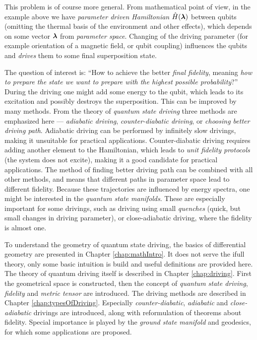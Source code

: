 This problem is of course more general. From mathematical point of view, in the example above we have \emph{parameter driven Hamiltonian} $\hat{H}({\bm\lambda})$ between qubits (omitting the thermal basis of the environment and other effects), which depends on some vector ${\bm\lambda}$ from \emph{parameter space}. Changing of the driving parameter (for example orientation of a magnetic field, or qubit coupling) influences the qubits and \emph{drives} them to some final superposition state.

The question of interest is: “How to achieve the better \emph{final fidelity}, meaning \emph{how to prepare the state we want to prepare with the highest possible probability}?” During the driving one might add some energy to the qubit, which leads to its excitation and possibly destroys the superposition. This can be improved by many methods. From the theory of \emph{quantum state driving} three methods are emphasized here — \emph{adiabatic driving}, \emph{counter-diabatic driving}, or \emph{choosing better driving path}. Adiabatic driving can be performed by infinitely slow drivings, making it unsuitable for practical applications. Counter-diabatic driving requires adding another element to the Hamiltonian, which leads to \emph{unit fidelity protocols} (the system does not excite), making it a good candidate for practical applications. The method of finding better driving path can be combined with all other methods, and means that different paths in parameter space lead to different fidelity. Because these trajectories are influenced by energy spectra, one might be interested in the \emph{quantum state manifolds}. These are especially important for some drivings, such as driving using small \emph{quenches} (quick, but small changes in driving parameter), or close-adiabatic driving, where the fidelity is almost one.

To understand the geometry of quantum state driving, the basics of differential geometry are presented in Chapter \ref{chap:mathIntro}. It does not serve the ifull theory, only some basic intuition is build and useful definitions are provided here. The theory of quantum driving itself is described in Chapter \ref{chap:driving}. First the geometrical space is constructed, then the concept of \emph{quantum state driving}, \emph{fidelity} and \emph{metric tensor} are introduced.
The driving methods are described in Chapter \ref{chap:typesOfDriving}. Especially \emph{counter-diabatic}, \emph{adiabatic} and \emph{close-adiabatic} drivings are introduced, along with reformulation of theorems about fidelity. Special importance is played by the \emph{ground state manifold} and geodesics, for which some applications are proposed.

